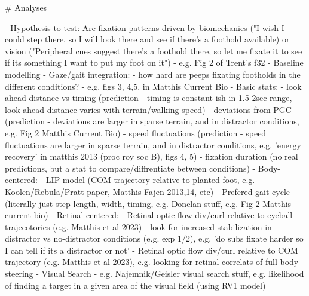 # Analyses

- Hypothesis to test: Are fixation patterns driven by biomechanics ("I wish I could step there, so I will look there and see if there's a foothold available) or vision ("Peripheral cues suggest there's a foothold there, so let me fixate it to see if its something I want to put my foot on it")
  - e.g. Fig 2 of Trent's f32
- Baseline modelling
  - Gaze/gait integration:
    - how hard are peeps fixating footholds in the different conditions?
        - e.g. figs 3, 4,5, in Matthis Current Bio
  - Basic stats:
    - look ahead distance vs timing (prediction - timing is constant-ish in 1.5-2sec range, look ahead distance varies with terrain/walking speed)
    - deviations from PGC (prediction - deviations are larger in sparse terrain, and in distractor conditions, e.g. Fig 2 Matthis Current Bio)
    - speed fluctuations (prediction - speed fluctuations are larger in sparse terrain, and in distractor conditions, e.g. 'energy recovery' in matthis 2013 (proc roy soc B), figs 4, 5)
    - fixation duration (no real predictions, but a stat to compare/diffrentiate between conditions)
  - Body-centered:
      - LIP model (COM trajectory relative to planted foot, e.g. Koolen/Rebula/Pratt paper, Matthis Fajen 2013,14, etc)
      - Prefered gait cycle (literally just step length, width, timing, e.g. Donelan stuff, e.g. Fig 2 Matthis current bio)
  - Retinal-centered:
      - Retinal optic flow div/curl relative to eyeball trajecotories (e.g. Matthis et al 2023)
        - look for increased stabilization in distractor vs no-distractor conditions (e.g. exp 1/2), e.g. 'do subs fixate harder so I can tell if its a distractor or not'
        - Retinal optic flow div/curl relative to COM trajectory (e.g. Matthis et al 2023), e.g. looking for retinal correlats of full-body steering
      - Visual Search - e.g. Najemnik/Geisler visual search stuff, e.g. likelihood of finding a target in a given area of the visual field (using RV1 model)


